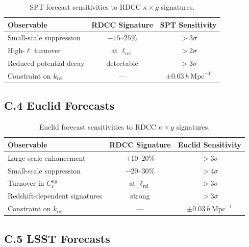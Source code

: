 \documentclass[11pt,a4paper]{article}
\begin{document}
\begin{table}[H]
\centering
\begin{tabular}{lcc}
\hline
\textbf{Observable} & \textbf{RDCC Signature} & \textbf{SPT Sensitivity} \\
\hline
Small-scale suppression & $-15$--$25\%$ & $>3\sigma$ \\
High-$\ell$ turnover & at $\ell_{\mathrm{rel}}$ & $>2\sigma$ \\
Reduced potential decay & detectable & $>3\sigma$ \\
Constraint on $k_{\mathrm{rel}}$ & --- & $\pm 0.03\,h\,\mathrm{Mpc}^{-1}$ \\
\hline
\end{tabular}
\caption{SPT forecast sensitivities to RDCC $\kappa \times g$ signatures.}
\end{table}

\subsection*{C.4 Euclid Forecasts}

\begin{table}[H]
\centering
\begin{tabular}{lcc}
\hline
\textbf{Observable} & \textbf{RDCC Signature} & \textbf{Euclid Sensitivity} \\
\hline
Large-scale enhancement & $+10$--$20\%$ & $>3\sigma$ \\
Small-scale suppression & $-20$--$30\%$ & $>4\sigma$ \\
Turnover in $C_{\ell}^{\kappa g}$ & at $\ell_{\mathrm{rel}}$ & $>3\sigma$ \\
Redshift-dependent signatures & strong & $>3\sigma$ \\
Constraint on $k_{\mathrm{rel}}$ & --- & $\pm 0.03\,h\,\mathrm{Mpc}^{-1}$ \\
\hline
\end{tabular}
\caption{Euclid forecast sensitivities to RDCC $\kappa \times g$ signatures.}
\end{table}

\subsection*{C.5 LSST Forecasts}
\end{document}
